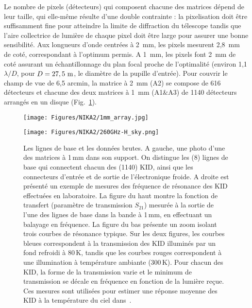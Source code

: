 Le nombre de pixels (détecteurs) qui composent chacune des matrices
dépend de leur taille, qui elle-même résulte d'une double contrainte :
la pixelisation doit être suffisamment fine pour atteindre la limite de
diffraction du télescope tandis que l'aire collectrice de lumière de
chaque pixel doit être large pour assurer une bonne sensibilité. Aux
longueurs d'onde centrées à 2~mm, les pixels mesurent 2,8~mm de coté,
correspondant à l'optimum permis. A 1~mm, les pixels font 2~mm de coté
assurant un échantillonnage du plan focal proche de l'optimalité
(environ 1,1 $\lambda/D$, pour $D = 27,5~\rm{m}$, le diamètre de la
pupille d'entrée). Pour couvrir le champ de vue de 6,5 arcmin, la
matrice à 2~mm (A2) se compose de 616 détecteurs et chacune des deux
matrices à 1~mm (A1\&A3) de 1140 détecteurs arrangés en un disque
(Fig.~\ref{fig:ma_fig}).


\begin{figure}[!ht]
  \begin{minipage}[c]{0.50\linewidth}
    \centering
    \texttt{[image: Figures/NIKA2/1mm\_array.jpg]}    
  \end{minipage}
  \hfill
  \begin{minipage}[c]{0.50\linewidth}
    \centering
     \texttt{[image: Figures/NIKA2/260GHz-H\_sky.png]}
  \end{minipage}
  \caption{Les lignes de base et les données brutes. A gauche, une
    photo d'une des matrices à 1\,mm dans son support. On distingue
    les (8) lignes de base qui connectent chacun des (1140) KID, ainsi
    que les connecteurs d'entrée et de sortie de l'électronique
    froide. A droite est présenté un exemple de mesures des fréquence
    de résonance des KID effectuées en laboratoire. La figure du haut
    montre la fonction de transfert (paramètre de transmission $S_{21}$)
    mesurée à la sortie de l'une des lignes de base dans la bande à
    1\,mm, en effectuant un balayage en fréquence. La figure du bas
    présente un zoom isolant trois courbes de résonance typique. Sur
    les deux figures, les courbes bleues correspondent à la
    transmission des KID illuminés par un fond refroidi à 80\,K,
    tandis que les courbes rouges correspondent à une illumination à
    température ambiante (300\,K). Pour chacun des KID, la forme de la
    transmission varie et le minimum de transmission se décale en
    fréquence en fonction de la lumière reçue. Ces mesures sont
    utilisées pour estimer une réponse moyenne des KID à la
    température du \og ciel \fg dans~\citet{Adam2018}.}
  \label{fig:ma_fig}  
\end{figure}
 
